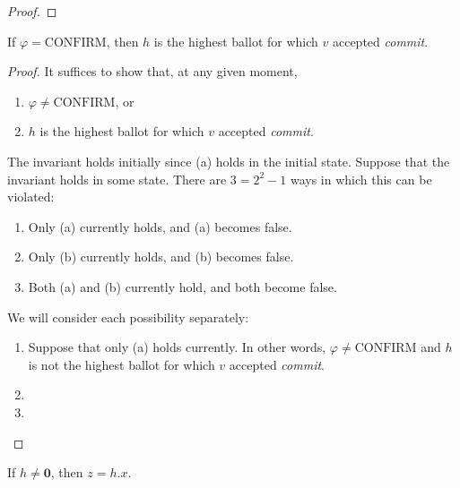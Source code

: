 \begin{proof}
\end{proof}


\begin{thm}
    If $\varphi = \text{CONFIRM}$, then $h$ is the highest ballot for which $v$ accepted \textit{commit}.
\end{thm}

\begin{proof}
    It suffices to show that, at any given moment,
    \begin{enumerate}[label=(\alph*)]
        \item %
            $\varphi \ne \text{CONFIRM}$, or
        \item %
            $h$ is the highest ballot for which $v$ accepted \textit{commit}.
    \end{enumerate}
    The invariant holds initially since (a) holds in the initial state.
    Suppose that the invariant holds in some state.
    There are $3 = 2^2 - 1$ ways in which this can be violated:
    \begin{enumerate}[label=(\roman*)]
        \item  %
            Only (a) currently holds, and (a) becomes false.
        \item  %
            Only (b) currently holds, and (b) becomes false.
        \item  %
            Both (a) and (b) currently hold, and both become false.
    \end{enumerate}
    We will consider each possibility separately:
    \begin{enumerate}[label=(\roman*)]
        \item  %
            Suppose that only (a) holds currently.
            In other words, $\varphi \ne \text{CONFIRM}$ and $h$ is not the highest ballot for which $v$ accepted \textit{commit}.
        \item  %
        \item  %
    \end{enumerate}
\end{proof}


\begin{thm}
    If $h \ne \textbf{0}$, then $z = h.x$.
\end{thm}

